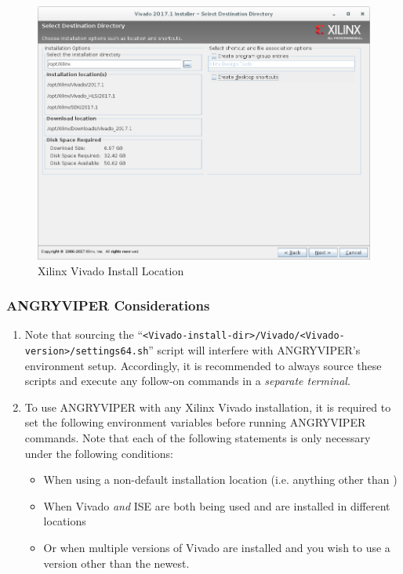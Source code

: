 \begin{flushleft}
\begin{flushleft}
\begin{enumerate}
\begin{figure}[H]
	\centerline{\includegraphics[scale=0.4]{figures/xilinx_vivado_2017_install_location}}
	\caption{Xilinx Vivado Install Location}
\end{figure}
\end{enumerate}
\subsubsection{ANGRYVIPER Considerations}
\begin{enumerate}
\item Note that sourcing the ``\verb+<Vivado-install-dir>/Vivado/<Vivado-version>/settings64.sh+'' script will interfere with ANGRYVIPER's environment setup. Accordingly, it is recommended to always source these scripts and execute any follow-on commands in a \textit{separate terminal}.
\item To use ANGRYVIPER with any Xilinx Vivado installation, it is required to set the following environment variables before running ANGRYVIPER commands. Note that each of the following  statements is only necessary under the following conditions:
\begin{itemize}
\item When using a non-default installation location (i.e. anything other than )
\item When Vivado \textit{and} ISE are both being used and are installed in different locations
\item Or when multiple versions of Vivado are installed and you wish to use a version other than the newest.
\end{itemize}


\end{enumerate}
\end{flushleft}
\end{flushleft}
